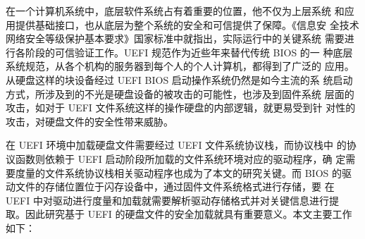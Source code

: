 \begin{cabstract}

在一个计算机系统中，底层软件系统占有着重要的位置，他不仅为上层系统
和应用提供基础接口，也从底层为整个系统的安全和可信提供了保障。《信息安
全技术网络安全等级保护基本要求》国家标准中就指出，实际运行中的关键系统
需要进行各阶段的可信验证工作。UEFI 规范作为近些年来替代传统 BIOS 的一
种底层系统规范，从各个机构的服务器到每个人的个人计算机，都得到了广泛的
应用。从硬盘这样的块设备经过 UEFI BIOS 启动操作系统仍然是如今主流的系
统启动方式，所涉及到的不光是硬盘设备的被攻击的可能性，也涉及到固件系统
层面的攻击，如对于 UEFI 文件系统这样的操作硬盘的内部逻辑，就更易受到针
对性的攻击，对硬盘文件的安全性带来威胁。
\par 在 UEFI 环境中加载硬盘文件需要经过 UEFI 文件系统协议栈，而协议栈中
的协议函数则依赖于 UEFI 启动阶段所加载的文件系统环境对应的驱动程序，确
定需要度量的文件系统协议栈相关驱动程序也成为了本文的研究关键。而 BIOS
的驱动文件的存储位置位于闪存设备中，通过固件文件系统格式进行存储，要
在 UEFI 中对驱动进行度量和加载就需要解析驱动存储格式并对关键信息进行提
取。因此研究基于 UEFI 的硬盘文件的安全加载就具有重要意义。本文主要工作
如下：


\end{cabstract}
